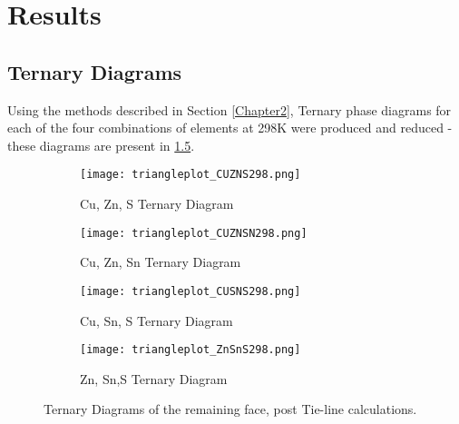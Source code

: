 
\chapter{Results} %

\label{Chapter3} %



\section{Ternary Diagrams}

Using the methods described in Section \ref{Chapter2}, Ternary phase diagrams for each of the four combinations of elements at 298K were produced and reduced - these diagrams are present in \ref{fig:298KTPD}. 

\begin{figure}[ht]
\centering
\begin{subfigure}{70mm}
  \centering
    \texttt{[image: triangleplot\_CUZNS298.png]}
    \caption{Cu, Zn, S Ternary Diagram}
    \label{fig:CuZnS}
\end{subfigure}%
\begin{subfigure}{70mm}
 \centering
    \texttt{[image: triangleplot\_CUZNSN298.png]}
    \caption{Cu, Zn, Sn Ternary Diagram}
    \label{fig:CuZnSn}
\end{subfigure}
\begin{subfigure}{70mm}
 \centering
    \texttt{[image: triangleplot\_CUSNS298.png]}
    \caption{Cu, Sn, S Ternary Diagram}
    \label{fig:CuSnS}
\end{subfigure}
\begin{subfigure}{70mm}
 \centering
    \texttt{[image: triangleplot\_ZnSnS298.png]}
    \caption{Zn, Sn,S Ternary Diagram}
    \label{fig:ZnSnS}
\end{subfigure}
\caption{Ternary Diagrams of the remaining face, post Tie-line calculations.}
\label{fig:298KTPD}
\end{figure}

